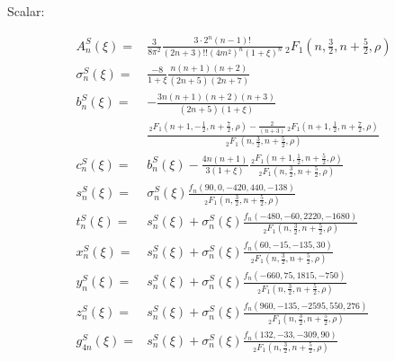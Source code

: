 \documentclass[aps,prc,superscriptaddress,showpacs,floatfix, nofootinbib,preprintnumbers,twocolumn]{revtex4}
\begin{document}
Scalar:
\begin{scriptsize}
\begin{align}
A^S_n(\xi)=&\frac{3}{8\pi^2}\frac{3\cdot 2^n(n-1)!}{(2n+3)!!(4m^2)^n(1+\xi)^n}\,_2F_1(n,\frac{3}{2},n+\frac{5}{2},\rho)\\
\sigma^S_n(\xi)=&\frac{-8}{1+\xi}\frac{n(n+1)(n+2)}{(2n+5)(2n+7)}\\
b^S_n(\xi)=&-\frac{3n(n+1)(n+2)(n+3)}{(2n+5)(1+\xi)}\nonumber\\
&\frac{\,_2F_1(n+1,-\frac{1}{2},n+\frac{7}{2},\rho)-\frac{2}{(n+3)}\,_2F_1(n+1,\frac{1}{2},n+\frac{7}{2},\rho)}{\,_2F_1(n,\frac{3}{2},n+\frac{5}{2},\rho)}\\
c^S_n(\xi)=&b^S_n(\xi)-\frac{4n(n+1)}{3(1+\xi)}\frac{\,_2F_1(n+1,\frac{1}{2},n+\frac{5}{2},\rho)}{\,_2F_1(n,\frac{3}{2},n+\frac{5}{2},\rho)}\\
s^S_n(\xi)=&\sigma^S_n(\xi)\frac{f_n(90,0,-420,440,-138)}{\,_2F_1(n,\frac{3}{2},n+\frac{5}{2},\rho)}\\
t^S_n(\xi)=&s^S_n(\xi)+\sigma^S_n(\xi)\frac{f_n(-480,-60,2220,-1680)}{\,_2F_1(n,\frac{3}{2},n+\frac{5}{2},\rho)}\\
x^S_n(\xi)=&s^S_n(\xi)+\sigma^S_n(\xi)\frac{f_n(60,-15,-135,30)}{\,_2F_1(n,\frac{3}{2},n+\frac{5}{2},\rho)}\\
y^S_n(\xi)=&s^S_n(\xi)+\sigma^S_n(\xi)\frac{f_n(-660,75,1815,-750)}{\,_2F_1(n,\frac{3}{2},n+\frac{5}{2},\rho)}\\
z^S_n(\xi)=&s^S_n(\xi)+\sigma^S_n(\xi)\frac{f_n(960,-135,-2595,550,276)}{\,_2F_1(n,\frac{3}{2},n+\frac{5}{2},\rho)}\\
g^S_{4n}(\xi)=&s^S_n(\xi)+\sigma^S_n(\xi)\frac{f_n(132,-33,-309,90)}{\,_2F_1(n,\frac{3}{2},n+\frac{5}{2},\rho)}
\end{align}
\end{scriptsize}
\end{document}

